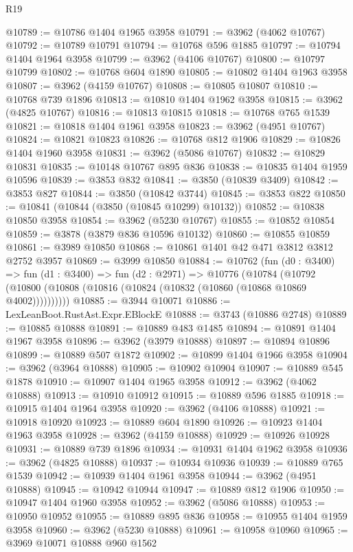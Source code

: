 \begin{lexlean}{R19}
\begin{coremodule}
@10789 := @10786 @1404 @1965 @3958
@10791 := @3962 (@4062 @10767)
@10792 := @10789 @10791
@10794 := @10768 @596 @1885
@10797 := @10794 @1404 @1964 @3958
@10799 := @3962 (@4106 @10767)
@10800 := @10797 @10799
@10802 := @10768 @604 @1890
@10805 := @10802 @1404 @1963 @3958
@10807 := @3962 (@4159 @10767)
@10808 := @10805 @10807
@10810 := @10768 @739 @1896
@10813 := @10810 @1404 @1962 @3958
@10815 := @3962 (@4825 @10767)
@10816 := @10813 @10815
@10818 := @10768 @765 @1539
@10821 := @10818 @1404 @1961 @3958
@10823 := @3962 (@4951 @10767)
@10824 := @10821 @10823
@10826 := @10768 @812 @1906
@10829 := @10826 @1404 @1960 @3958
@10831 := @3962 (@5086 @10767)
@10832 := @10829 @10831
@10835 := @10148 @10767 @895 @836
@10838 := @10835 @1404 @1959 @10596
@10839 := @3853 @832
@10841 := @3850 (@10839 @3409)
@10842 := @3853 @827
@10844 := @3850 (@10842 @3744)
@10845 := @3853 @822
@10850 := @10841 (@10844 (@3850 (@10845 @10299) @10132))
@10852 := @10838 @10850 @3958
@10854 := @3962 (@5230 @10767)
@10855 := @10852 @10854
@10859 := @3878 (@3879 @836 @10596 @10132)
@10860 := @10855 @10859
@10861 := @3989 @10850
@10868 := @10861 @1401 @42 @471 @3812 @3812 @2752 @3957
@10869 := @3999 @10850
@10884 := @10762
    (fun (d0 : @3400) =>
    fun (d1 : @3400) =>
    fun (d2 : @2971) =>
    @10776
      (@10784 (@10792 (@10800 (@10808 (@10816 (@10824 (@10832 (@10860 (@10868 @10869 @4002))))))))))
@10885 := @3944 @10071
@10886 := LexLeanBoot.RustAst.Expr.EBlockE
@10888 := @3743 (@10886 @2748)
@10889 := @10885 @10888
@10891 := @10889 @483 @1485
@10894 := @10891 @1404 @1967 @3958
@10896 := @3962 (@3979 @10888)
@10897 := @10894 @10896
@10899 := @10889 @507 @1872
@10902 := @10899 @1404 @1966 @3958
@10904 := @3962 (@3964 @10888)
@10905 := @10902 @10904
@10907 := @10889 @545 @1878
@10910 := @10907 @1404 @1965 @3958
@10912 := @3962 (@4062 @10888)
@10913 := @10910 @10912
@10915 := @10889 @596 @1885
@10918 := @10915 @1404 @1964 @3958
@10920 := @3962 (@4106 @10888)
@10921 := @10918 @10920
@10923 := @10889 @604 @1890
@10926 := @10923 @1404 @1963 @3958
@10928 := @3962 (@4159 @10888)
@10929 := @10926 @10928
@10931 := @10889 @739 @1896
@10934 := @10931 @1404 @1962 @3958
@10936 := @3962 (@4825 @10888)
@10937 := @10934 @10936
@10939 := @10889 @765 @1539
@10942 := @10939 @1404 @1961 @3958
@10944 := @3962 (@4951 @10888)
@10945 := @10942 @10944
@10947 := @10889 @812 @1906
@10950 := @10947 @1404 @1960 @3958
@10952 := @3962 (@5086 @10888)
@10953 := @10950 @10952
@10955 := @10889 @895 @836
@10958 := @10955 @1404 @1959 @3958
@10960 := @3962 (@5230 @10888)
@10961 := @10958 @10960
@10965 := @3969 @10071 @10888 @960 @1562

\end{coremodule}
\end{lexlean}
